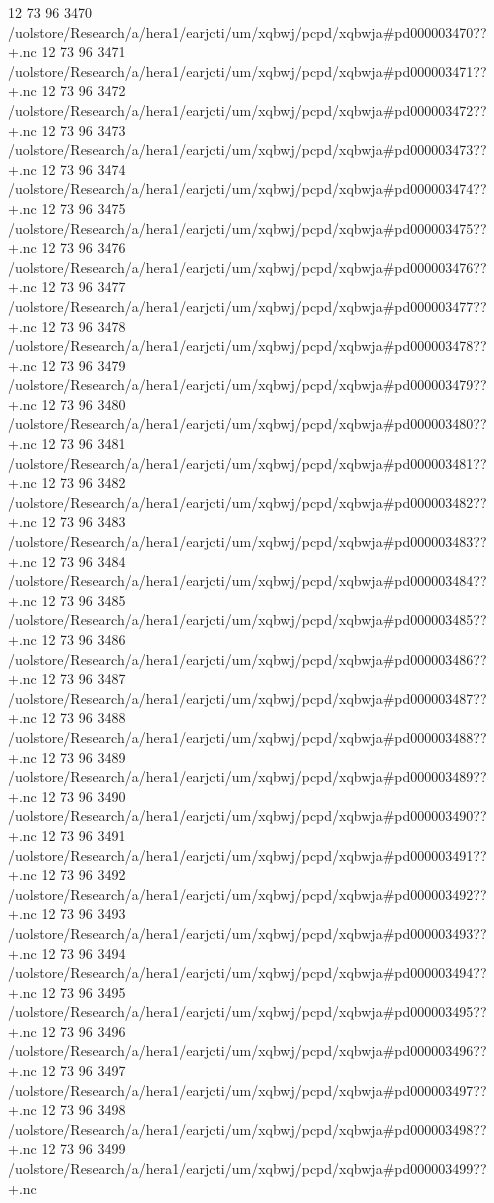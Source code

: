 12 73 96
3470
/uolstore/Research/a/hera1/earjcti/um/xqbwj/pcpd/xqbwja#pd000003470??+.nc
12 73 96
3471
/uolstore/Research/a/hera1/earjcti/um/xqbwj/pcpd/xqbwja#pd000003471??+.nc
12 73 96
3472
/uolstore/Research/a/hera1/earjcti/um/xqbwj/pcpd/xqbwja#pd000003472??+.nc
12 73 96
3473
/uolstore/Research/a/hera1/earjcti/um/xqbwj/pcpd/xqbwja#pd000003473??+.nc
12 73 96
3474
/uolstore/Research/a/hera1/earjcti/um/xqbwj/pcpd/xqbwja#pd000003474??+.nc
12 73 96
3475
/uolstore/Research/a/hera1/earjcti/um/xqbwj/pcpd/xqbwja#pd000003475??+.nc
12 73 96
3476
/uolstore/Research/a/hera1/earjcti/um/xqbwj/pcpd/xqbwja#pd000003476??+.nc
12 73 96
3477
/uolstore/Research/a/hera1/earjcti/um/xqbwj/pcpd/xqbwja#pd000003477??+.nc
12 73 96
3478
/uolstore/Research/a/hera1/earjcti/um/xqbwj/pcpd/xqbwja#pd000003478??+.nc
12 73 96
3479
/uolstore/Research/a/hera1/earjcti/um/xqbwj/pcpd/xqbwja#pd000003479??+.nc
12 73 96
3480
/uolstore/Research/a/hera1/earjcti/um/xqbwj/pcpd/xqbwja#pd000003480??+.nc
12 73 96
3481
/uolstore/Research/a/hera1/earjcti/um/xqbwj/pcpd/xqbwja#pd000003481??+.nc
12 73 96
3482
/uolstore/Research/a/hera1/earjcti/um/xqbwj/pcpd/xqbwja#pd000003482??+.nc
12 73 96
3483
/uolstore/Research/a/hera1/earjcti/um/xqbwj/pcpd/xqbwja#pd000003483??+.nc
12 73 96
3484
/uolstore/Research/a/hera1/earjcti/um/xqbwj/pcpd/xqbwja#pd000003484??+.nc
12 73 96
3485
/uolstore/Research/a/hera1/earjcti/um/xqbwj/pcpd/xqbwja#pd000003485??+.nc
12 73 96
3486
/uolstore/Research/a/hera1/earjcti/um/xqbwj/pcpd/xqbwja#pd000003486??+.nc
12 73 96
3487
/uolstore/Research/a/hera1/earjcti/um/xqbwj/pcpd/xqbwja#pd000003487??+.nc
12 73 96
3488
/uolstore/Research/a/hera1/earjcti/um/xqbwj/pcpd/xqbwja#pd000003488??+.nc
12 73 96
3489
/uolstore/Research/a/hera1/earjcti/um/xqbwj/pcpd/xqbwja#pd000003489??+.nc
12 73 96
3490
/uolstore/Research/a/hera1/earjcti/um/xqbwj/pcpd/xqbwja#pd000003490??+.nc
12 73 96
3491
/uolstore/Research/a/hera1/earjcti/um/xqbwj/pcpd/xqbwja#pd000003491??+.nc
12 73 96
3492
/uolstore/Research/a/hera1/earjcti/um/xqbwj/pcpd/xqbwja#pd000003492??+.nc
12 73 96
3493
/uolstore/Research/a/hera1/earjcti/um/xqbwj/pcpd/xqbwja#pd000003493??+.nc
12 73 96
3494
/uolstore/Research/a/hera1/earjcti/um/xqbwj/pcpd/xqbwja#pd000003494??+.nc
12 73 96
3495
/uolstore/Research/a/hera1/earjcti/um/xqbwj/pcpd/xqbwja#pd000003495??+.nc
12 73 96
3496
/uolstore/Research/a/hera1/earjcti/um/xqbwj/pcpd/xqbwja#pd000003496??+.nc
12 73 96
3497
/uolstore/Research/a/hera1/earjcti/um/xqbwj/pcpd/xqbwja#pd000003497??+.nc
12 73 96
3498
/uolstore/Research/a/hera1/earjcti/um/xqbwj/pcpd/xqbwja#pd000003498??+.nc
12 73 96
3499
/uolstore/Research/a/hera1/earjcti/um/xqbwj/pcpd/xqbwja#pd000003499??+.nc
